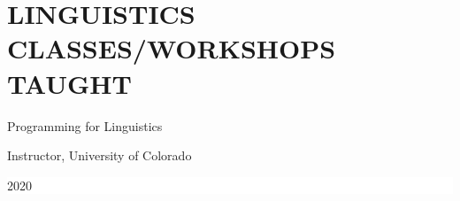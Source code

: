 \documentclass[paper=a4,fontsize=11pt]{article} %
\newcommand{\sepspace}{\vspace*{1em}}		%
\newcommand{\NewPart}[1]{\section*{\uppercase{#1}}}
\newcommand{\CourseEntry}[3]{
		\noindent
		\parbox{19em}{#1}
        \hspace{.5em} 
        \parbox{18.75em}{#2} 
        \hfill
		\colorbox{White}{%
			\parbox{4.5em}{%
			\hfill\color{Black}#3}}  \par}
\begin{document}






\NewPart{Linguistics Classes/Workshops Taught}{}

\CourseEntry{Programming for Linguistics}{Instructor, University of Colorado}{2020}

\end{document}
